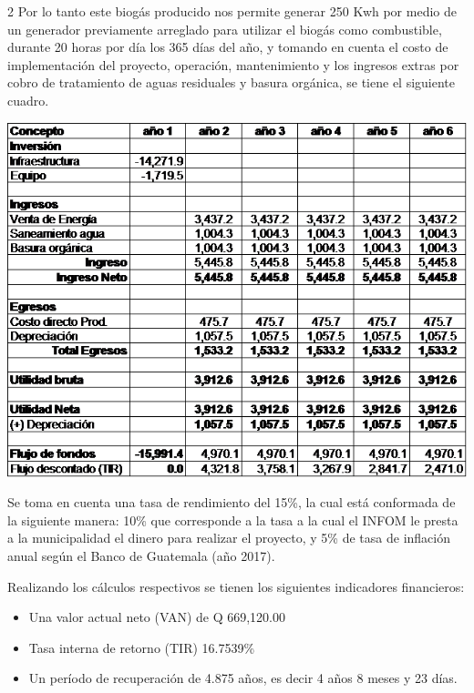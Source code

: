 \documentclass[11pt,spanish,Letterpaper,openany]{book}
\providecommand{\tightlist}{%
  \setlength{\itemsep}{0pt}\setlength{\parskip}{0pt}}
\begin{document}
\begin {multicols}{2}
Por lo tanto este biogás producido nos permite generar 250 Kwh por medio de un generador previamente arreglado para utilizar el biogás como combustible, durante 20 horas por día los 365 días del año, y tomando en cuenta el costo de implementación del proyecto, operación, mantenimiento y los ingresos extras por cobro de tratamiento de aguas residuales y basura orgánica, se tiene el siguiente cuadro.

\begin {flushleft}
\noindent\begin{minipage}[c]{\columnwidth}

\includegraphics[width=1\linewidth]{images/201901-gfong-imagen07}

\end{minipage}

\end {flushleft}

Se toma en cuenta una tasa de rendimiento del 15\%, la cual está conformada de la siguiente manera: 10\% que corresponde a la tasa a la cual el INFOM le presta a la municipalidad el dinero para realizar el proyecto, y 5\% de tasa de inflación anual según el Banco de Guatemala (año 2017).

Realizando los cálculos respectivos se tienen los siguientes indicadores financieros:

\begin{itemize}
\tightlist
\item
  Una valor actual neto (VAN) de Q 669,120.00
\item
  Tasa interna de retorno (TIR) 16.7539\%
\item
  Un período de recuperación de 4.875 años, es decir 4 años 8 meses y 23 días.
\end{itemize}


\end{multicols}
\end{document}
